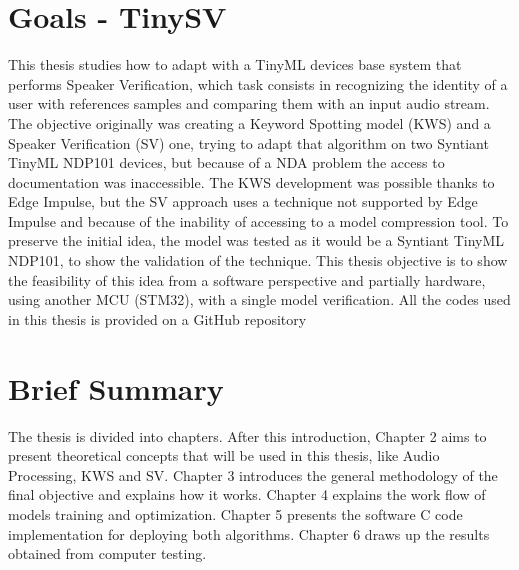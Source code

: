 \section{Goals - TinySV}
\label{sec:tinysv}
This thesis studies how to adapt with a TinyML devices base system that performs Speaker Verification, which task consists in recognizing the identity of a user with references samples and comparing them with an input audio stream. The objective originally was creating a Keyword Spotting model (KWS) and a Speaker Verification (SV) one, trying to adapt that algorithm on two Syntiant TinyML NDP101 devices, but because of a NDA problem the access to documentation was inaccessible. The KWS development was possible thanks to Edge Impulse\cite{edgeimpulse_syntiant_tinyml}, but the SV approach\cite{dvector_extractor_TinySV} uses a technique not supported by Edge Impulse and because of the inability of accessing to a model compression tool. To preserve the initial idea, the model was tested as it would be a Syntiant TinyML NDP101, to show the validation of the technique. This thesis objective is to show the feasibility of this idea from a software perspective and partially hardware, using another MCU (STM32), with a single model verification. All the codes used in this thesis is provided on a GitHub repository\footnotemark{}
\section{Brief Summary}
The thesis is divided into chapters. After this introduction, Chapter 2 aims to present theoretical concepts that will be used in this thesis, like Audio Processing, KWS and SV. Chapter 3 introduces the general methodology of the final objective and explains how it works. Chapter 4 explains the work flow of models training and optimization. Chapter 5 presents the software C code implementation for deploying both algorithms. Chapter 6 draws up the results obtained from computer testing.
\newpage